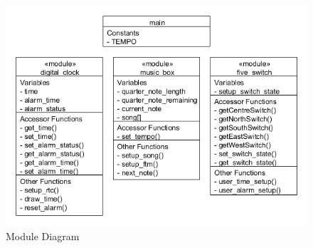 \documentclass{article}
\begin{document}
\newpage
\begin{figure}
\centering
\includegraphics[width=150mm]{module_diagram.png}
\caption{Module Diagram}
\label{overflow}
\end{figure}
\end{document}
